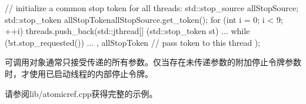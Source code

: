 \begin{cpp}
// initialize a common stop token for all threads:
std::stop_source allStopSource;
std::stop_token allStopToken{allStopSource.get_token()};
for (int i = 0; i < 9; ++i) {
	threads.push_back(std::jthread{[] (std::stop_token st) {
			...
			while (!st.stop_requested()) {
				...
			}
		},
		allStopToken // pass token to this thread
	});
}
\end{cpp}

可调用对象通常只接受传递的所有参数。仅当存在未传递参数的附加停止令牌参数时，才使用已启动线程的内部停止令牌。

请参阅lib/atomicref.cpp获得完整的示例。












